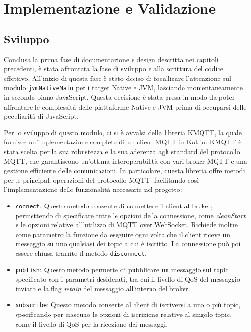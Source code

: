 \documentclass[12pt,a4paper,openright,twoside]{book}
\begin{document}
\chapter{Implementazione e Validazione}\label{chap:Implementazione e Validazione} 

\section{Sviluppo} 

Conclusa la prima fase di documentazione e design descritta nei capitoli precedenti, è stata affrontata la fase di sviluppo e alla scrittura del codice effettivo. 
All'inizio di questa fase è stato deciso di focallizare l'attenzione sul modulo \texttt{jvmNativeMain} per i target Native e \ac{JVM}, lasciando momentaneamente 
in secondo piano JavaScript. Questa decisione è stata presa in modo da poter affrontare le complessità delle piattaforme Native e JVM prima di occuparsi delle 
peculiarità di JavaScript.

Per lo sviluppo di questo modulo, ci si è avvalsi della libreria KMQTT, la quale fornisce un'implementazione completa di un client \ac{MQTT} in Kotlin. 
KMQTT è stata scelta per la sua robustezza e la sua aderenza agli standard del protocollo \ac{MQTT}, che garantiscono un'ottima interoperabilità con vari 
broker MQTT e una gestione efficiente delle comunicazioni. In particolare, questa libreria offre metodi per le principali operazioni del protocollo \ac{MQTT},
facilitando così l'implementazione delle funzionalità necessarie nel progetto:
\begin{itemize}
    \item \texttt{connect}: Questo metodo consente di connettere il client al broker, permettendo di specificare tutte le opzioni della connessione, 
    come \textit{cleanStart} e le opzioni relative all'utilizzo di \ac{MQTT} over WebSocket. Richiede inoltre come parametro la funzione da eseguire 
    ogni volta che il client riceve un messaggio su uno qualsiasi dei topic a cui è iscritto. La connessione può poi essere chiusa tramite il metodo \texttt{disconnect}.

    \item \texttt{publish}: Questo metodo permette di pubblicare un messaggio sul topic specificato con i parametri desiderati, tra cui il livello di 
    \ac{QoS} del messaggio inviato e la flag \textit{retain} del messaggio all'interno del broker.

    \item \texttt{subscribe}: Questo metodo consente al client di iscriversi a uno o più topic, specificando per ciascuno le opzioni di iscrizione relative 
    al singolo topic, come il livello di \ac{QoS} per la ricezione dei messaggi.
\end{itemize}
\end{document}
